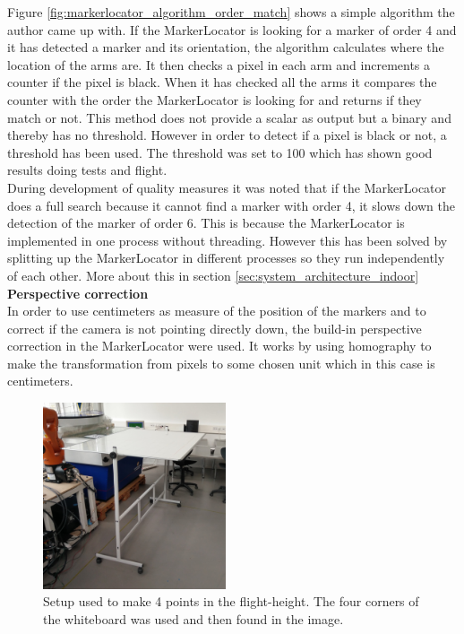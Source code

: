 Figure \ref{fig:markerlocator_algorithm_order_match} shows a simple algorithm the author came up with.
If the MarkerLocator is looking for a marker of order 4 and it has detected a marker and its orientation, the algorithm calculates where the location of the arms are. It then checks a pixel in each arm and increments a counter if the pixel is black. When it has checked all the arms it compares the counter with the order the MarkerLocator is looking for and returns if they match or not. 
This method does not provide a scalar as output but a binary and thereby has no threshold. However in order to detect if a pixel is black or not, a threshold has been used. The threshold was set to 100 which has shown good results doing tests and flight. \\

During development of quality measures it was noted that if the MarkerLocator does a full search because it cannot find a marker with order 4, it slows down the detection of the marker of order 6. This is because the MarkerLocator is implemented in one process without threading. However this has been solved by splitting up the MarkerLocator in different processes so they run independently of each other. More about this in section  \ref{sec:system_architecture_indoor} \\

\textbf{Perspective correction} \\
In order to use centimeters as measure of the position of the markers and to correct if the camera is not pointing directly down, the build-in perspective correction in the MarkerLocator were used.
It works by using homography\cite{janeriksolem2012} to make the transformation from pixels to some chosen unit which in this case is centimeters.
\begin{figure}
  \vspace{-20pt}
  \begin{center}
    \includegraphics[width=0.48\textwidth]{graphics/whiteboard_tilted.jpg}
  \end{center}
  \vspace{-20pt}
  \caption{Setup used to make 4 points in the flight-height. The four corners of the whiteboard was used and then found in the image. } \label{fig:whiteboard_setup}
  \vspace{-10pt}
\end{figure}

